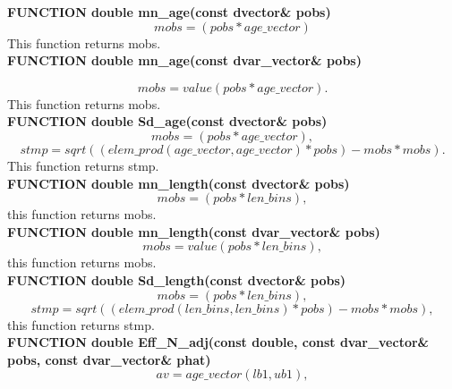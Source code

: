 \documentclass{article}
\begin{document}
\textbf{FUNCTION double mn\_age(const dvector\& pobs)}
\begin{equation}
    mobs = (pobs*age\_vector)
\end{equation}
This function returns mobs.\\

\textbf{FUNCTION double mn\_age(const dvar\_vector\& pobs)}

\begin{equation}
    mobs = value(pobs*age\_vector).
\end{equation}
This function returns mobs.\\

\textbf{FUNCTION double Sd\_age(const dvector\& pobs)}\\
\begin{equation}
    mobs = (pobs*age\_vector),
\end{equation}
\begin{equation}
    stmp = sqrt((elem\_prod(age\_vector,age\_vector)*pobs) - mobs*mobs).
\end{equation}
This function returns stmp.\\
\textbf{FUNCTION double mn\_length(const dvector\& pobs)}\\
\begin{equation}
    mobs = (pobs*len\_bins),
\end{equation}
this function returns mobs.\\
\textbf{FUNCTION double mn\_length(const dvar\_vector\& pobs)}\\
\begin{equation}
    mobs = value(pobs*len\_bins),
\end{equation}
this function returns mobs.\\

\textbf{FUNCTION double Sd\_length(const dvector\& pobs)}\\
\begin{equation}
    mobs = (pobs*len\_bins),
\end{equation}
\begin{equation}
    stmp = sqrt((elem\_prod(len\_bins,len\_bins)*pobs) - mobs*mobs),
\end{equation}
this function returns stmp.\\

\textbf{FUNCTION double Eff\_N\_adj(const double, const dvar\_vector\& pobs, const dvar\_vector\& phat)}\\
\begin{equation}
    av = age\_vector(lb1,ub1),
\end{equation}
\end{document}

